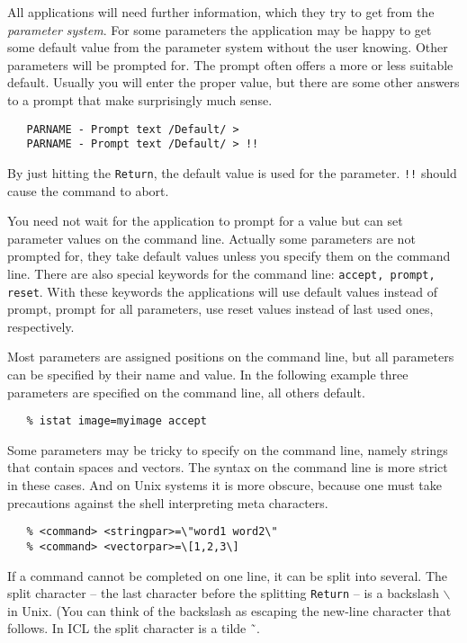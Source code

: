 All applications will need further information, which they try to get from the
{\it parameter system}. For some parameters the application may be happy to get
some default value from the parameter system without the user knowing. Other
parameters will be prompted for. The prompt often offers a more or less
suitable default. Usually you will enter the proper value, but there are some
other answers to a prompt that make surprisingly much sense.

\begin{verbatim}
   PARNAME - Prompt text /Default/ > 
   PARNAME - Prompt text /Default/ > !!
\end{verbatim}

By just hitting the {\tt Return}, the default value is used for the
parameter.  {\tt !!} should cause the command to abort.

You need not wait for the application to prompt for a value but can set
parameter values on the command line. Actually some parameters are not
prompted for, they take default values unless you specify them on the
command line.  There are also special keywords for the command line:
{\tt accept, prompt, reset}.  With these keywords the applications will
use default values instead of prompt, prompt for all parameters, use
reset values instead of last used ones, respectively.

Most parameters are assigned positions on the command line, but all parameters
can be specified by their name and value. In the following example three
parameters are specified on the command line, all others default.

\begin{verbatim}
   % istat image=myimage accept
\end{verbatim}

Some parameters may be tricky to specify on the command line, namely
strings that contain spaces and vectors. The syntax on the command line
is more strict in these cases. And on Unix systems it is more obscure,
because one must take precautions against the shell interpreting meta
characters.

\begin{verbatim}
   % <command> <stringpar>=\"word1 word2\"
   % <command> <vectorpar>=\[1,2,3\]
\end{verbatim}

If a command cannot be completed on one line, it can be split into
several. The split character -- the last character before the splitting
{\tt Return} -- is a backslash $\backslash$ in Unix.  (You can think of
the backslash as escaping the new-line character that follows.  In ICL
the split character is a tilde {\~\ }.

